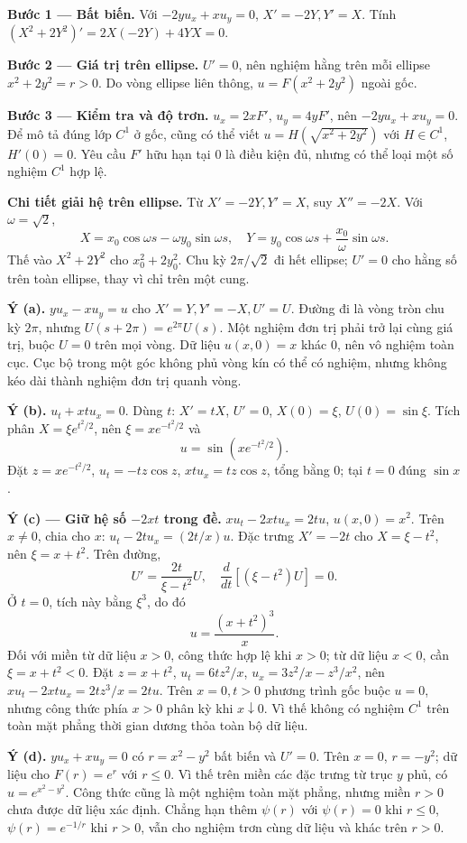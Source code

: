 \textbf{Bước 1 — Bất biến.} Với $-2yu_x+xu_y=0$, $X'=-2Y,Y'=X$. Tính $(X^2+2Y^2)'=2X(-2Y)+4YX=0$.

\textbf{Bước 2 — Giá trị trên ellipse.} $U'=0$, nên nghiệm hằng trên mỗi ellipse $x^2+2y^2=r>0$. Do vòng ellipse liên thông, $u=F(x^2+2y^2)$ ngoài gốc.

\textbf{Bước 3 — Kiểm tra và độ trơn.} $u_x=2xF'$, $u_y=4yF'$, nên $-2yu_x+xu_y=0$. Để mô tả đúng lớp $C^1$ ở gốc, cũng có thể viết $u=H(\sqrt{x^2+2y^2})$ với $H\in C^1$, $H'(0)=0$. Yêu cầu $F'$ hữu hạn tại 0 là điều kiện đủ, nhưng có thể loại một số nghiệm $C^1$ hợp lệ.

\textbf{Chi tiết giải hệ trên ellipse.} Từ $X'=-2Y,Y'=X$, suy $X''=-2X$. Với $\omega=\sqrt2$,
\[X=x_0\cos\omega s-\omega y_0\sin\omega s,\quad
Y=y_0\cos\omega s+\frac{x_0}{\omega}\sin\omega s.\]
Thế vào $X^2+2Y^2$ cho $x_0^2+2y_0^2$. Chu kỳ $2\pi/\sqrt2$ đi hết ellipse; $U'=0$ cho hằng số trên toàn ellipse, thay vì chỉ trên một cung.

\textbf{Ý (a).} $yu_x-xu_y=u$ cho $X'=Y,Y'=-X,U'=U$. Đường đi là vòng tròn chu kỳ $2\pi$, nhưng $U(s+2\pi)=e^{2\pi}U(s)$. Một nghiệm đơn trị phải trở lại cùng giá trị, buộc $U=0$ trên mọi vòng. Dữ liệu $u(x,0)=x$ khác 0, nên vô nghiệm toàn cục. Cục bộ trong một góc không phủ vòng kín có thể có nghiệm, nhưng không kéo dài thành nghiệm đơn trị quanh vòng.

\textbf{Ý (b).} $u_t+xtu_x=0$. Dùng $t$: $X'=tX$, $U'=0$, $X(0)=\xi$, $U(0)=\sin\xi$. Tích phân $X=\xi e^{t^2/2}$, nên $\xi=xe^{-t^2/2}$ và
\[u=\sin(xe^{-t^2/2}).\]
Đặt $z=xe^{-t^2/2}$, $u_t=-tz\cos z$, $xtu_x=tz\cos z$, tổng bằng 0; tại $t=0$ đúng $\sin x$.

\textbf{Ý (c) — Giữ hệ số $-2xt$ trong đề.} $xu_t-2xtu_x=2tu$, $u(x,0)=x^2$. Trên $x\ne0$, chia cho $x$: $u_t-2tu_x=(2t/x)u$. Đặc trưng $X'= -2t$ cho $X=\xi-t^2$, nên $\xi=x+t^2$. Trên đường,
\[U'=\frac{2t}{\xi-t^2}U,\quad \frac{d}{dt}[(\xi-t^2)U]=0.\]
Ở $t=0$, tích này bằng $\xi^3$, do đó
\[u=\frac{(x+t^2)^3}{x}.\]
Đối với miền từ dữ liệu $x>0$, công thức hợp lệ khi $x>0$; từ dữ liệu $x<0$, cần $\xi=x+t^2<0$. Đặt $z=x+t^2$, $u_t=6tz^2/x$, $u_x=3z^2/x-z^3/x^2$, nên $xu_t-2xtu_x=2tz^3/x=2tu$. Trên $x=0,t>0$ phương trình gốc buộc $u=0$, nhưng công thức phía $x>0$ phân kỳ khi $x\downarrow0$. Vì thế không có nghiệm $C^1$ trên toàn mặt phẳng thời gian dương thỏa toàn bộ dữ liệu.

\textbf{Ý (d).} $yu_x+xu_y=0$ có $r=x^2-y^2$ bất biến và $U'=0$. Trên $x=0$, $r=-y^2$; dữ liệu cho $F(r)=e^r$ với $r\le0$. Vì thế trên miền các đặc trưng từ trục $y$ phủ, có $u=e^{x^2-y^2}$. Công thức cũng là một nghiệm toàn mặt phẳng, nhưng miền $r>0$ chưa được dữ liệu xác định. Chẳng hạn thêm $\psi(r)$ với $\psi(r)=0$ khi $r\le0$, $\psi(r)=e^{-1/r}$ khi $r>0$, vẫn cho nghiệm trơn cùng dữ liệu và khác trên $r>0$.

